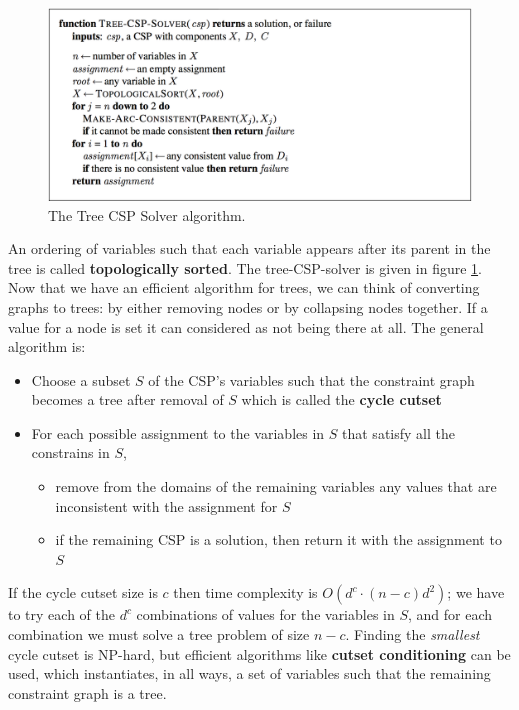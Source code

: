 \documentclass[twoside]{article}
\begin{document}
\begin{figure}
  \includegraphics[width=\linewidth]{tcs.png}
  \caption{The Tree CSP Solver algorithm.}
  \label{fig:tcs}
\end{figure}
An ordering of variables such that each variable appears after its parent in
the tree is called \textbf{topologically sorted}. The tree-CSP-solver is given
in figure \ref{fig:tcs}. Now that we have an efficient algorithm for trees, we 
can think of converting graphs to trees: by either removing nodes or by 
collapsing nodes together. If a value for a node is set it can considered as 
not being there at all. The general algorithm is:
\begin{itemize}
        \item Choose a subset \(S\) of the CSP's variables such that the 
        constraint graph becomes a tree after removal of \(S\) which is called
        the \textbf{cycle cutset}
        \item For each possible assignment to the variables in \(S\) that satisfy
        all the constrains in \(S\),
        \begin{itemize}
                \item remove from the domains of the remaining variables any
                values that are inconsistent with the assignment for \(S\)
                \item if the remaining CSP is a solution, then return it with 
                the assignment to \(S\)
        \end{itemize}
\end{itemize}
If the cycle cutset size is \(c\) then time complexity is \(O(d^c\cdot (n-c)d^2)\);
we have to try each of the \(d^c\) combinations of values for the variables in
\(S\), and for each combination we must solve a tree problem of size \(n-c\).
Finding the \emph{smallest} cycle cutset is NP-hard, but efficient algorithms 
like \textbf{cutset conditioning} can be used, which instantiates, in all ways,
a set of variables such that the remaining constraint graph is a tree.
\end{document}
